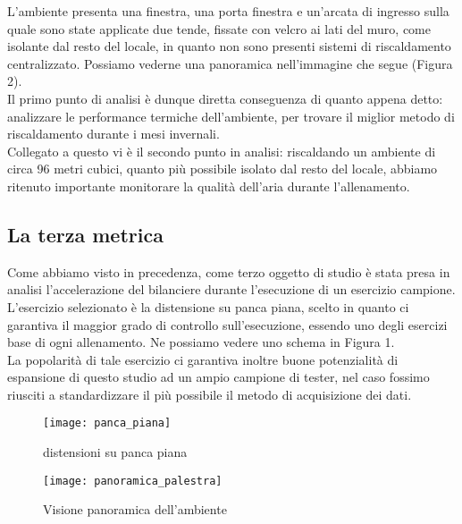 \documentclass[fleqn,10pt]{SelfArx} %
\begin{document}
L'ambiente presenta una finestra, una porta finestra e un'arcata di ingresso sulla quale sono state applicate 
due tende, fissate con velcro ai lati del muro, come isolante dal resto del locale, in quanto non 
sono presenti sistemi di riscaldamento centralizzato. Possiamo vederne una panoramica nell'immagine che segue 
(Figura 2). \\

Il primo punto di analisi è dunque diretta conseguenza di quanto appena detto: analizzare le performance 
termiche dell'ambiente, per trovare il miglior metodo di riscaldamento durante i mesi invernali.\\
Collegato a questo vi è il secondo punto in analisi: riscaldando un ambiente di circa 96 metri cubici, quanto 
più possibile isolato dal resto del locale, abbiamo ritenuto importante monitorare la qualità dell'aria 
durante l'allenamento.

\subsection{La terza metrica}
Come abbiamo visto in precedenza, come terzo oggetto di studio è stata presa in analisi l'accelerazione del bilanciere 
durante l'esecuzione di un esercizio campione.\\
L'esercizio selezionato è la distensione su panca piana, scelto in quanto ci garantiva il maggior grado di controllo 
sull'esecuzione, essendo uno degli esercizi base di ogni allenamento. Ne possiamo vedere uno schema in Figura 1.\\

La popolarità di tale esercizio ci garantiva inoltre buone potenzialità di espansione di questo studio ad un 
ampio campione di tester, nel caso fossimo riusciti a standardizzare il più possibile il metodo di acquisizione dei dati.

\begin{figure}[htb!]\centering
	\texttt{[image: panca\_piana]}
	\caption{distensioni su panca piana}
	\label{fig:panca_piana}
\end{figure}

\begin{figure*}[ht]\centering %
	\texttt{[image: panoramica\_palestra]}
	\caption{Visione panoramica dell'ambiente}
	\label{fig:view}
\end{figure*}
\end{document}

